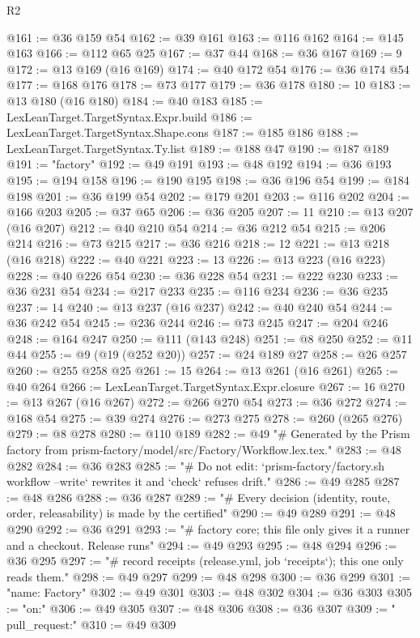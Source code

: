 \begin{lexlean}{R2}
\begin{coremodule}
@161 := @36 @159 @54
@162 := @39 @161
@163 := @116 @162
@164 := @145 @163
@166 := @112 @65 @25
@167 := @37 @44
@168 := @36 @167
@169 := 9
@172 := @13 @169 (@16 @169)
@174 := @40 @172 @54
@176 := @36 @174 @54
@177 := @168 @176
@178 := @73 @177
@179 := @36 @178
@180 := 10
@183 := @13 @180 (@16 @180)
@184 := @40 @183
@185 := LexLeanTarget.TargetSyntax.Expr.build
@186 := LexLeanTarget.TargetSyntax.Shape.cons
@187 := @185 @186
@188 := LexLeanTarget.TargetSyntax.Ty.list
@189 := @188 @47
@190 := @187 @189
@191 := "factory"
@192 := @49 @191
@193 := @48 @192
@194 := @36 @193
@195 := @194 @158
@196 := @190 @195
@198 := @36 @196 @54
@199 := @184 @198
@201 := @36 @199 @54
@202 := @179 @201
@203 := @116 @202
@204 := @166 @203
@205 := @37 @65
@206 := @36 @205
@207 := 11
@210 := @13 @207 (@16 @207)
@212 := @40 @210 @54
@214 := @36 @212 @54
@215 := @206 @214
@216 := @73 @215
@217 := @36 @216
@218 := 12
@221 := @13 @218 (@16 @218)
@222 := @40 @221
@223 := 13
@226 := @13 @223 (@16 @223)
@228 := @40 @226 @54
@230 := @36 @228 @54
@231 := @222 @230
@233 := @36 @231 @54
@234 := @217 @233
@235 := @116 @234
@236 := @36 @235
@237 := 14
@240 := @13 @237 (@16 @237)
@242 := @40 @240 @54
@244 := @36 @242 @54
@245 := @236 @244
@246 := @73 @245
@247 := @204 @246
@248 := @164 @247
@250 := @111 (@143 @248)
@251 := @8 @250
@252 := @11 @44
@255 := @9 (@19 (@252 @20))
@257 := @24 @189 @27
@258 := @26 @257
@260 := @255 @258 @25
@261 := 15
@264 := @13 @261 (@16 @261)
@265 := @40 @264
@266 := LexLeanTarget.TargetSyntax.Expr.closure
@267 := 16
@270 := @13 @267 (@16 @267)
@272 := @266 @270 @54
@273 := @36 @272
@274 := @168 @54
@275 := @39 @274
@276 := @273 @275
@278 := @260 (@265 @276)
@279 := @8 @278
@280 := @110 @189
@282 := @49
    "# Generated by the Prism factory from prism-factory/model/src/Factory/Workflow.lex.tex."
@283 := @48 @282
@284 := @36 @283
@285 := "# Do not edit: `prism-factory/factory.sh workflow --write` rewrites it and `check` refuses drift."
@286 := @49 @285
@287 := @48 @286
@288 := @36 @287
@289 := "# Every decision (identity, route, order, releasability) is made by the certified"
@290 := @49 @289
@291 := @48 @290
@292 := @36 @291
@293 := "# factory core; this file only gives it a runner and a checkout. Release runs"
@294 := @49 @293
@295 := @48 @294
@296 := @36 @295
@297 := "# record receipts (release.yml, job `receipts`); this one only reads them."
@298 := @49 @297
@299 := @48 @298
@300 := @36 @299
@301 := "name: Factory"
@302 := @49 @301
@303 := @48 @302
@304 := @36 @303
@305 := "on:"
@306 := @49 @305
@307 := @48 @306
@308 := @36 @307
@309 := "  pull_request:"
@310 := @49 @309

\end{coremodule}
\end{lexlean}

